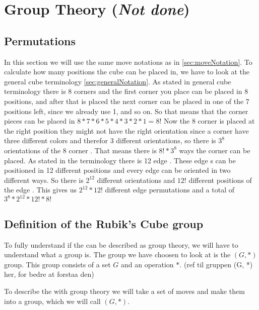 \chapter{Group Theory (\textit{Not done})}


\section{Permutations}
In this section we will use the same move notations as in \ref{sec:moveNotation}.
To calculate how many positions the cube can be placed in, we have to look at the general cube terminology \ref{sec:generalNotation}.
As stated in general cube terminology there is 8 corners \cpiece{} and the first corner you place can be placed in 8 positions, and after that is placed the next corner \cpiece{} can be placed in one of the 7 positions left, since we already use 1, and so on. So that means that the corner pieces can be placed in $8*7*6*5*4*3*2*1=8!$ Now the 8 corner \cpiece{} is placed at the right position they might not have the right orientation since a corner \cpiece{} have three different colors and therefor 3 different orientations, so there is $3^8$ orientations of the 8 corner \cpiece{}. That means there is $8!*3^8$ ways the corner \cpiece{} can be placed. As stated in the terminology there is 12 edge \cpiece{}. These edge \cpiece{}s can be positioned in 12 different positions and every edge \cpiece{} can be oriented in two different ways. So there is $2^12$ different orientations and $12!$ different positions of the edge \cpiece{}. This gives us $2^{12}*12!$ different edge permutations and a total of $3^8*2^{12}*12!*8!$

\section{Definition of the Rubik's Cube group}
To fully understand if the \rubik{} can be described as group theory, we will have to understand what a group is.
The group we have choosen to look at is the $(G, *)$ group. This group consists of a set $G$ and an operation $*$. (ref til gruppen (G, *) her, for bedre at forstaa den)

To describe the \rubik{} with group theory we will take a set of moves and make them into a group, which we will call $(G, *)$.

